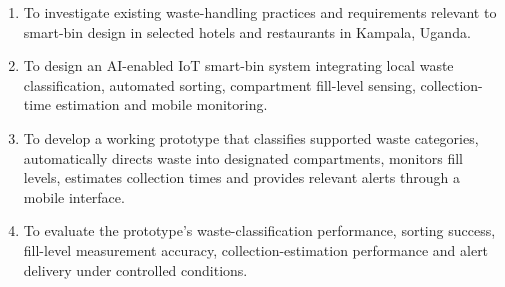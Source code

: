 \begin{enumerate}[leftmargin=*,itemsep=0.4em]
\item To investigate existing waste-handling practices and requirements relevant to smart-bin design in selected hotels and restaurants in Kampala, Uganda.
\item To design an AI-enabled IoT smart-bin system integrating local waste classification, automated sorting, compartment fill-level sensing, collection-time estimation and mobile monitoring.
\item To develop a working prototype that classifies supported waste categories, automatically directs waste into designated compartments, monitors fill levels, estimates collection times and provides relevant alerts through a mobile interface.
\item To evaluate the prototype's waste-classification performance, sorting success, fill-level measurement accuracy, collection-estimation performance and alert delivery under controlled conditions.
\end{enumerate}
